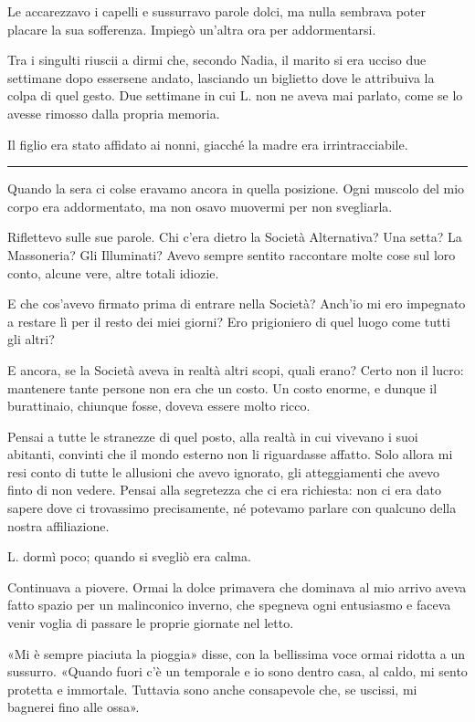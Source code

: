 \documentclass[a4paper,11pt,oneside,openright,final]{memoir}
\begin{document}
Le accarezzavo i capelli e sussurravo parole dolci, ma nulla sembrava poter
placare la sua sofferenza. Impiegò un'altra ora per addormentarsi.

Tra i singulti riuscii a dirmi che, secondo Nadia, il marito si era ucciso due
settimane dopo essersene andato, lasciando un biglietto dove le attribuiva la
colpa di quel gesto. Due settimane in cui L. non ne aveva mai parlato, come se
lo avesse rimosso dalla propria memoria.

Il figlio era stato affidato ai nonni, giacché la madre era irrintracciabile.

\plainbreak{1}

Quando la sera ci colse eravamo ancora in quella posizione. Ogni muscolo del
mio corpo era addormentato, ma non osavo muovermi per non svegliarla.

Riflettevo sulle sue parole. Chi c'era dietro la Società Alternativa? Una setta?
La Massoneria? Gli Illuminati? Avevo sempre sentito raccontare molte cose sul
loro conto, alcune vere, altre totali idiozie.

E che cos'avevo firmato prima di entrare nella Società? Anch'io mi ero impegnato
a restare lì per il resto dei miei giorni? Ero prigioniero di quel luogo come
tutti gli altri?

E ancora, se la Società aveva in realtà altri scopi, quali erano? Certo non il
lucro: mantenere tante persone non era che un costo. Un costo enorme, e dunque
il burattinaio, chiunque fosse, doveva essere molto ricco.

Pensai a tutte le stranezze di quel posto, alla realtà in cui vivevano i suoi
abitanti, convinti che il mondo esterno non li riguardasse affatto. Solo allora
mi resi conto di tutte le allusioni che avevo ignorato, gli atteggiamenti che
avevo finto di non vedere. Pensai alla segretezza che ci era richiesta: non ci
era dato sapere dove ci trovassimo precisamente, né potevamo parlare con
qualcuno della nostra affiliazione.

L. dormì poco; quando si svegliò era calma.

Continuava a piovere. Ormai la dolce primavera che dominava al mio arrivo aveva
fatto spazio per un malinconico inverno, che spegneva ogni entusiasmo e faceva
venir voglia di passare le proprie giornate nel letto.

«Mi è sempre piaciuta la pioggia» disse, con la bellissima voce ormai ridotta
a un sussurro. «Quando fuori c'è un temporale e io sono dentro casa, al caldo,
mi sento protetta e immortale. Tuttavia sono anche consapevole che, se uscissi,
mi bagnerei fino alle ossa».
\end{document}
